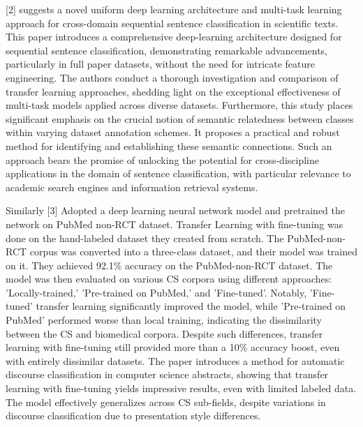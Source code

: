 \documentclass[12pt,a4paper]{report}     %
\begin{document}
\begin{normalsize}
{[2] suggests a novel uniform deep learning architecture and multi-task learning approach for cross-domain sequential sentence classification in scientific texts. This paper introduces a comprehensive deep-learning architecture designed for sequential sentence classification, demonstrating remarkable advancements, particularly in full paper datasets, without the need for intricate feature engineering. The authors conduct a thorough investigation and comparison of transfer learning approaches, shedding light on the exceptional effectiveness of multi-task models applied across diverse datasets. Furthermore, this study places significant emphasis on the crucial notion of semantic relatedness between classes within varying dataset annotation schemes. It proposes a practical and robust method for identifying and establishing these semantic connections. Such an approach bears the promise of unlocking the potential for cross-discipline applications in the domain of sentence classification, with particular relevance to academic search engines and information retrieval systems.

Similarly [3] Adopted a deep learning neural network model and pretrained the network on PubMed non-RCT dataset. Transfer Learning with fine-tuning was done on the hand-labeled dataset they created from scratch. The PubMed-non-RCT corpus was converted into a three-class dataset, and their model was trained on it. They achieved 92.1\% accuracy on the PubMed-non-RCT dataset. The model was then evaluated on various CS corpora using different approaches: 'Locally-trained,' 'Pre-trained on PubMed,' and 'Fine-tuned'. Notably, 'Fine-tuned' transfer learning significantly improved the model, while 'Pre-trained on PubMed' performed worse than local training, indicating the dissimilarity between the CS and biomedical corpora. Despite such differences, transfer learning with fine-tuning still provided more than a 10\% accuracy boost, even with entirely dissimilar datasets. The paper introduces a method for automatic discourse classification in computer science abstracts, showing that transfer learning with fine-tuning yields impressive results, even with limited labeled data. The model effectively generalizes across CS sub-fields, despite variations in discourse classification due to presentation style differences.

}
\end{normalsize}
\end{document}
